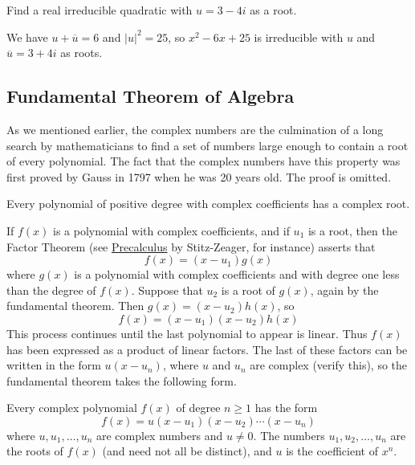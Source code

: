 \documentclass{ximera}
\begin{document}
\begin{example}\label{ex:034182}
Find a real irreducible quadratic with $u = 3 - 4i$ as a root.

\begin{explanation}
  We have $u + \overline{u} = 6$ and $|u|^{2} = 25$, so $x^{2} - 6x + 25$ is irreducible with $u$ and $\overline{u} = 3 + 4i$ as roots.
\end{explanation}
\end{example}

\subsection*{Fundamental Theorem of Algebra}

As we mentioned earlier, the complex
numbers are the culmination of a long search by mathematicians to find a
 set of numbers large enough to contain a root of every polynomial. The
fact that the complex numbers have this property was first proved by
Gauss in 1797 when he was 20 years old. The proof is omitted.

\begin{theorem}\label{th:034196}
Every polynomial of positive degree with complex coefficients has a complex root.
\end{theorem}

If $f(x)$ is a polynomial with complex coefficients, and if $u_{1}$ is a root, then the Factor Theorem (see \href{https://www.stitz-zeager.com/}{Precalculus} by Stitz-Zeager, for instance) asserts that
\begin{equation*}
f(x) = (x-u_1)g(x)
\end{equation*}
where $g(x)$ is a polynomial with complex coefficients and with degree one less than the degree of $f(x)$. Suppose that $u_{2}$ is a root of $g(x)$, again by the fundamental theorem. Then $g(x) = (x - u_{2})h(x)$, so
\begin{equation*}
f(x) = (x-u_1)(x-u_2)h(x)
\end{equation*}
This process continues until the last polynomial to appear is linear. Thus $f(x)$ has been expressed as a product of linear factors. The last of these factors can be written in the form $u(x - u_{n})$, where $u$ and $u_{n}$ are complex (verify this), so the fundamental theorem takes the following form.


\begin{theorem}\label{th:034210}
Every complex polynomial $f(x)$ of degree $n \geq 1$ has the form
\begin{equation*}
f(x) = u(x-u_1)(x-u_2)\cdots (x-u_n)
\end{equation*}
where $u, u_{1}, \dots, u_{n}$ are complex numbers and $u \neq 0$. The numbers $u_{1}, u_{2}, \dots, u_{n}$ are the roots of $f(x)$ (and need not all be distinct), and $u$ is the coefficient of $x^{n}$.
\end{theorem}
\end{document}
